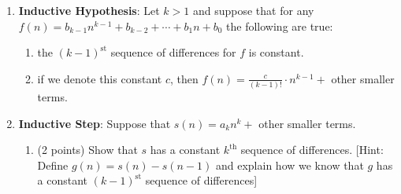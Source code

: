 \documentclass{article}
\newenvironment{solution}{\textit{Solution}.}
\def \proofDistance {5pt}
\newcommand{\sol}[1]{
    \vspace{\proofDistance}
    \begin{solution}
    #1
    \end{solution}
}
\begin{document}
\begin{enumerate}
\begin{enumerate}
        
        \item \textbf{Inductive Hypothesis}: Let $k > 1$ and suppose that for any $f(n) = b_{k-1}n^{k-1}+b_{k-2}+\cdots + b_1n + b_0$ the following are true:
        \begin{enumerate}
            \item the $(k - 1)^\text{st}$ sequence of differences for $f$ is constant. 
            \item if we denote this constant $c$, then $f(n) = \displaystyle \frac{c}{(k-1)!}\cdot n^{k-1} +$ other smaller terms. \\
        \end{enumerate} 
        
        \item \textbf{Inductive Step}: Suppose that $s(n) = a_kn^k +$ other smaller terms. 
        \begin{enumerate}
            \item (2 points) Show that $s$ has a constant $k^\text{th}$ sequence of differences. [Hint: Define $g(n) = s(n) - s(n-1)$ and explain how we know that $g$ has a constant $(k - 1)^\text{st}$ sequence of differences] \\


\end{enumerate}
\end{enumerate}
\end{enumerate}
\end{document}
